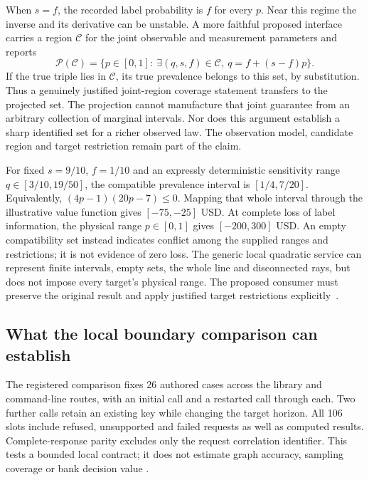 When $s=f$, the recorded label probability is $f$ for every $p$.
Near this regime the inverse and its derivative can be unstable. A more
faithful proposed interface carries a region $\mathcal C$ for the joint
observable and measurement parameters and reports
\begin{equation}
 \mathcal P(\mathcal C)=
 \{p\in[0,1]:\ \exists(q,s,f)\in\mathcal C,
                    \ q=f+(s-f)p\}.
 \label{exec13:observation-label-projection}
\end{equation}
If the true triple lies in $\mathcal C$, its true prevalence belongs to
this set, by substitution. Thus a genuinely justified joint-region coverage
statement transfers to the projected set. The projection cannot manufacture
that joint guarantee from an arbitrary collection of marginal intervals.
Nor does this argument establish a sharp identified set for a richer
observed law. The observation model, candidate region and target restriction
remain part of the claim.

For fixed $s=9/10$, $f=1/10$ and an expressly deterministic sensitivity
range $q\in[3/10,19/50]$, the compatible prevalence interval is
$[1/4,7/20]$. Equivalently,
$(4p-1)(20p-7)\leq0$. Mapping that whole interval through the illustrative
value function gives $[-75,-25]$ USD. At complete loss of label information,
the physical range $p\in[0,1]$ gives $[-200,300]$ USD. An empty compatibility
set instead indicates conflict among the supplied ranges and restrictions;
it is not evidence of zero loss. The generic local quadratic service can
represent finite intervals, empty sets, the whole line and disconnected
rays, but does not impose every target's physical range. The proposed
consumer must preserve the original result and apply justified target
restrictions explicitly~\citep{exec13_observation_exact,exec13_observation_primary}.

\subsection{What the local boundary comparison can establish}

The registered comparison fixes 26 authored cases across the library and
command-line routes, with an initial call and a restarted call through each.
Two further calls retain an existing key while changing the target horizon.
All 106 slots include refused, unsupported and failed requests as well as
computed results. Complete-response parity excludes only the request
correlation identifier. This tests a bounded local contract; it does not
estimate graph accuracy, sampling coverage or bank decision value
\citep{exec13_observation_design,exec13_observation_run}.

